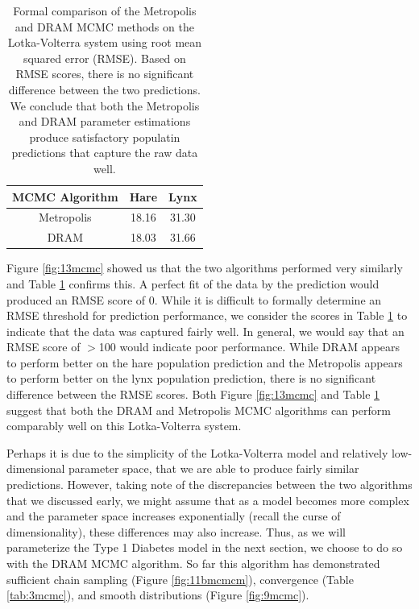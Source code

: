 \begin{table}[H]
\centering
        \begin{tabular}{c | c c}
            \cline{1-3}
            \textbf{MCMC Algorithm}  &\textbf{Hare} & \textbf{Lynx}\\
            \hline
            Metropolis & 18.16 & 31.30\\
            DRAM & 18.03 & 31.66
             \\\hline
            \hline
        \end{tabular}
    \caption{Formal comparison of the Metropolis and DRAM MCMC methods on the Lotka-Volterra system using root mean squared error (RMSE). Based on RMSE scores, there is no significant difference between the two predictions. We conclude that both the Metropolis and DRAM parameter estimations produce satisfactory populatin predictions that capture the raw data well.}
    \label{tab:4mcmc}
\end{table}
Figure \ref{fig:13mcmc} showed us that the two algorithms performed very similarly and Table \ref{tab:4mcmc} confirms this. A perfect fit of the data by the prediction would produced an RMSE score of 0. While it is difficult to formally determine an RMSE threshold for prediction performance, we consider the scores in Table \ref{tab:4mcmc} to indicate that the data was captured fairly well. In general, we would say that an RMSE score of $>$100 would indicate poor performance. While DRAM appears to perform better on the hare population prediction and the Metropolis appears to perform better on the lynx population prediction, there is no significant difference between the RMSE scores. Both Figure \ref{fig:13mcmc} and Table \ref{tab:4mcmc} suggest that both the DRAM and Metropolis MCMC algorithms can perform comparably well on this Lotka-Volterra system.
\par Perhaps it is due to the simplicity of the Lotka-Volterra model and relatively low-dimensional parameter space, that we are able to produce fairly similar predictions. However, taking note of the discrepancies between the two algorithms that we discussed early, we might assume that as a model becomes more complex and the parameter space increases exponentially (recall the curse of dimensionality), these differences may also increase. Thus, as we will parameterize the Type 1 Diabetes model in the next section, we choose to do so with the DRAM MCMC algorithm. So far this algorithm has demonstrated sufficient chain sampling (Figure \ref{fig:11bmcmcm}), convergence (Table \ref{tab:3mcmc}), and smooth distributions (Figure \ref{fig:9mcmc}).


